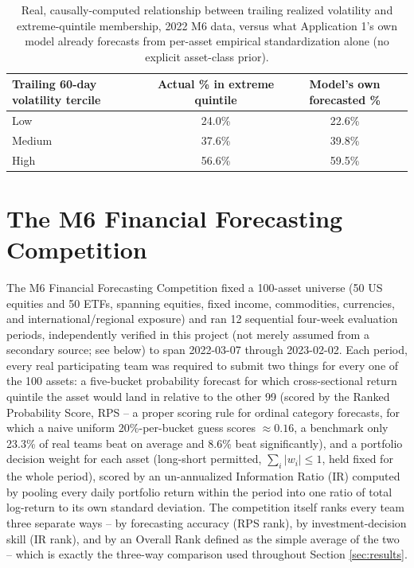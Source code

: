 \documentclass[11pt]{article}
\begin{document}
\begin{table}[htbp]
\centering
\begin{tabular}{@{}lcc@{}}
\toprule
Trailing 60-day volatility tercile & Actual \% in extreme quintile & Model's own forecasted \% \\
\midrule
Low  & 24.0\% & 22.6\% \\
Medium & 37.6\% & 39.8\% \\
High & 56.6\% & 59.5\% \\
\bottomrule
\end{tabular}
\caption{Real, causally-computed relationship between trailing realized
volatility and extreme-quintile membership, 2022 M6 data, versus what
Application 1's own model already forecasts from per-asset empirical
standardization alone (no explicit asset-class prior).}
\label{tab:vol-calibration}
\end{table}

\section{The M6 Financial Forecasting Competition}
\label{sec:m6}

The M6 Financial Forecasting Competition \citep{makridakis2024} fixed a
100-asset universe (50 US equities and 50 ETFs, spanning equities, fixed
income, commodities, currencies, and international/regional exposure) and ran
12 sequential four-week evaluation periods, independently verified in this
project (not merely assumed from a secondary source; see below) to span
2022-03-07 through 2023-02-02. Each period, every real participating team was
required to submit two things for every one of the 100 assets: a five-bucket
probability forecast for which cross-sectional return quintile the asset would
land in relative to the other 99 (scored by the Ranked Probability Score, RPS
-- a proper scoring rule for ordinal category forecasts, for which a naive
uniform 20\%-per-bucket guess scores $\approx 0.16$, a benchmark only 23.3\% of
real teams beat on average and 8.6\% beat significantly), and a portfolio
decision weight for each asset (long-short permitted, $\sum_i |w_i|\le 1$,
held fixed for the whole period), scored by an un-annualized Information Ratio
(IR) computed by pooling every daily portfolio return within the period into
one ratio of total log-return to its own standard deviation. The competition
itself ranks every team three separate ways -- by forecasting accuracy (RPS
rank), by investment-decision skill (IR rank), and by an Overall Rank defined
as the simple average of the two -- which is exactly the three-way comparison
used throughout Section \ref{sec:results}.
\end{document}
